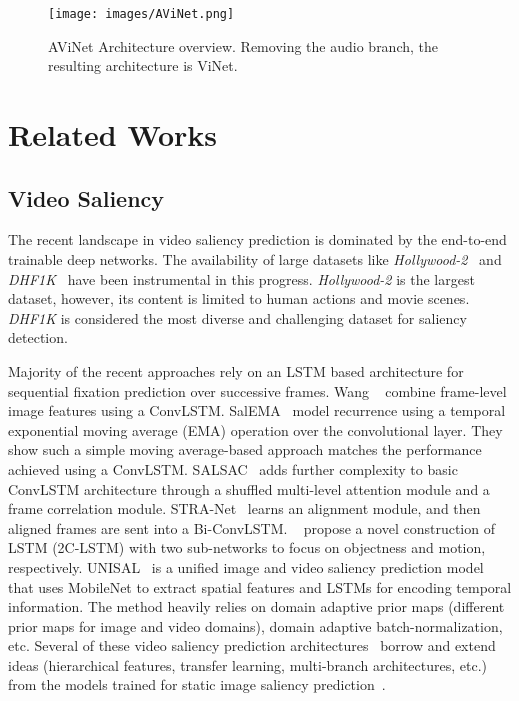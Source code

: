 \documentclass[letterpaper, 10 pt, conference]{ieeeconf}  \usepackage{times}
\begin{document}
\begin{figure*}[]
\texttt{[image: images/AViNet.png]}
\caption{AViNet Architecture overview. Removing the audio branch, the resulting architecture is ViNet. }
\label{fig:AViNet}
\end{figure*}

\section{Related Works}

\subsection{Video Saliency}

The recent landscape in video saliency prediction is dominated by the end-to-end trainable deep networks. The availability of large datasets like \emph{Hollywood-2}~\cite{marszalek2009actions} and \emph{DHF1K}~\cite{wang2018revisiting} have been instrumental in this progress. \emph{Hollywood-2} is the largest dataset, however, its content is limited to human actions and movie scenes. \emph{DHF1K} is considered the most diverse and challenging dataset for saliency detection.

Majority of the recent approaches rely on an LSTM based architecture for sequential fixation prediction over successive frames. Wang \etal~\cite{wang2018revisiting} combine frame-level image features using a ConvLSTM. SalEMA~\cite{linardos2019simple} model recurrence using a temporal exponential moving average (EMA) operation over the convolutional layer. They show such a simple moving average-based approach matches the performance achieved using a ConvLSTM. SALSAC~\cite{wu2020salsac} adds further complexity to basic ConvLSTM architecture through a shuffled multi-level attention module and a frame correlation module. STRA-Net~\cite{chen2020video} learns an alignment module, and then aligned frames are sent into a Bi-ConvLSTM. ~\cite{jiang2017predicting} propose a novel construction of LSTM (2C-LSTM) with two sub-networks to focus on objectness and motion, respectively. UNISAL~\cite{droste2020unified} is a unified image and video saliency prediction model that uses MobileNet to extract spatial features and LSTMs for encoding temporal information. The method heavily relies on domain adaptive prior maps (different prior maps for image and video domains), domain adaptive batch-normalization, etc. Several of these video saliency prediction architectures~\cite{droste2020unified,wang2018revisiting} borrow and extend ideas (hierarchical features, transfer learning, multi-branch architectures, etc.) from the models trained for static image saliency prediction~\cite{jiang2015salicon,reddy2020tidying}.  
\end{document}
